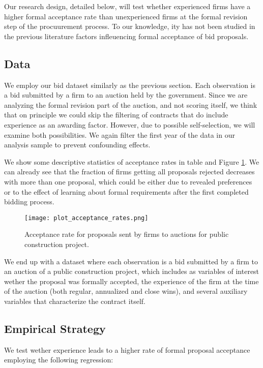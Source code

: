 Our research design, detailed below, will test whether experienced firms have a higher formal acceptance rate than unexperienced firms at the formal revision step of the procuurement process. To our knowledge, ity has not been studied in the previous literature factors infleuencing formal acceptance of bid proposals.

\subsection{Data}
We employ our bid dataset similarly as the previous section. Each observation is a bid submitted by a firm to an auction held by the government. Since we are analyzing the formal revision part of the auction, and not scoring itself, we think that on principle we could skip the filtering of contracts that do include experience as an awarding factor. However, due to possible self-selection, we will examine both possibilities. We again filter the first year of the data in our analysis sample to prevent confounding effects.

We show some descriptive statistics of acceptance rates in table and Figure \ref{fig:plot_acceptance_rates}. We can already see that the fraction of firms getting all proposals rejected decreases with more than one proposal, which could be either due to revealed preferences or to the effect of learning about formal requirements after the first completed bidding process.

\begin{figure}
  \texttt{[image: plot\_acceptance\_rates.png]}
  \caption{Acceptance rate for proposals sent by firms to auctions for public construction project.}
  \label{fig:plot_acceptance_rates}
\end{figure}

We end up with a dataset where each observation is a bid submitted by a firm to an auction of a public construction project, which includes as variables of interest wether the proposal was formally accepted, the experience of the firm at the time of the auction (both regular, annualized and close wins), and several  auxiliary variables that characterize the contract itself.

\subsection{Empirical Strategy}
We test wether experience leads to a higher rate of formal proposal acceptance employing the following regression:

